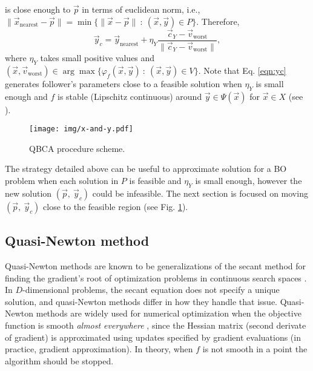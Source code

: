 \documentclass[conference]{IEEEtran}
\theoremstyle{definition}
\begin{document}
is close enough to $\vec{p}$ in terms of euclidean norm, i.e.,
$ \| \vec{x}_{\text{nearest}} - \vec{p} \| = \min\{ \| \vec{x} - \vec{p} \| \ : \ (\vec{x}, \vec{y}) \in P  \} $.
Therefore,
% 
\begin{equation}
    \vec{y}_c = \vec{y}_{\text{nearest}} + \eta_{Y} \dfrac{\vec{c}_Y - \vec{v}_{\text{worst}}}{\| \vec{c}_Y - \vec{v}_{\text{worst}} \|},
    \label{eqn:yc}
\end{equation} %
% 
where $\eta_Y$ takes small positive values and 
% 
$
    (\vec{x}, \vec{v}_{\text{worst}}) \in \arg \max \{\varphi_f(\vec{x}, \vec{y} )  \ : \ (\vec{x}, \vec{y}) \in V \}
$. Note that Eq. \ref{eqn:yc} generates follower's parameters close to a feasible
solution when $\eta_{Y}$ is small enough and $f$ is stable (Lipschitz continuous)
around $\vec{y} \in \Psi(\vec{x}) $ for  $\vec{x} \in X$ (see \cite{dempe2002foundations}). %
% 

% 
\begin{figure}[!ht]
    \centering
    \texttt{[image: img/x-and-y.pdf]}
    \caption{QBCA procedure scheme.}
    \label{fig:qca}
\end{figure}
% 
The strategy detailed above can be useful to approximate solution for a BO problem
when each solution in  $P$ is feasible and $\eta_{Y}$ is small enough, however
the new solution $(\vec{p},\ \vec{y}_c)$ could be infeasible. The next section
is focused on moving $(\vec{p},\ \vec{y}_c)$ close to the feasible region
(see Fig. \ref{fig:qca}).


\subsection{Quasi-Newton method} %
\label{sub:nonsmooth_optimization_via_bfgs}

Quasi-Newton methods are known to be generalizations of the secant method for
finding the gradient's root of optimization problems in continuous search spaces \cite{fletcher2013practical,liu1989limited}.
In $D$-dimensional problems, the secant equation does not specify a unique solution,
and quasi-Newton methods differ in how they handle that issue. Quasi-Newton methods
are widely used for numerical optimization when the objective function is smooth
\textit{almost everywhere} \cite{lewis2013nonsmooth}, since the Hessian matrix
(second derivate of gradient) is approximated using updates specified by gradient
evaluations (in practice, gradient approximation). In theory, when $f$ is not
smooth in a point the algorithm should be stopped. 
\end{document}
